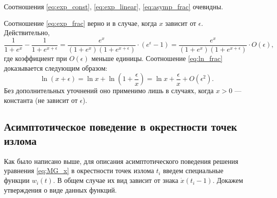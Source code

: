 Соотношения \eqref{eq:exp_const}, \eqref{eq:exp_linear}, \eqref{eq:asymp_frac} очевидны.

Соотношение \eqref{eq:exp_frac} верно и в случае, когда $x$ зависит от $\epsilon$. Действительно,
%
\[
\dfrac{1}{1 + e^x} - \dfrac{1}{1 + e^{x + \epsilon}} = \dfrac{e^x}{(1 + e^x)(1 + e^{x + \epsilon})} \cdot (e^{\epsilon} - 1) = \dfrac{e^x}{(1 + e^x)(1 + e^{x + \epsilon})} \cdot O(\epsilon),
\]
где коэффициент при $O(\epsilon)$ меньше единицы.
%
Соотношение \eqref{eq:ln_frac} доказывается следующим образом:
\[
\ln(x + \epsilon) = \ln x + \ln\left(1 + \frac{\epsilon}{x}\right) = \ln x + \frac{\epsilon}{x} + O(\epsilon^2).
\]
Без дополнительных уточнений оно применимо лишь в случаях, когда $x > 0$ --- константа (не зависит от $\epsilon$).

\subsection{Асимптотическое поведение в окрестности точек излома}
\label{subsect:ch1:w_func}

Как было написано выше, для описания асимптотического поведения решения уравнения \eqref{eq:MG_x} в окрестности точек излома $t_i$ введем специальные функции $w_i(t)$. В общем случае их вид зависит от знака $\dot{x}(t_i - 1)$. Докажем утверждения о виде данных функций.

